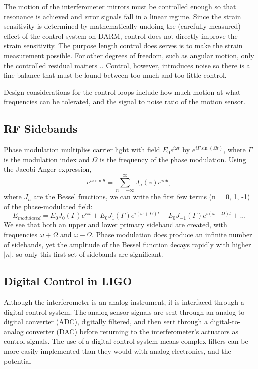 The motion of the interferometer mirrors must be controlled enough so
that resonance is achieved and error signals fall in a linear
regime. Since the strain sensitivity is determined by mathematically
undoing the (carefully measured) effect of the control system on DARM,
control does not directly improve the strain sensitivity. The purpose
length control does serves is to make the strain measurement
possible. For other degrees of freedom, such as angular motion, only
the controlled residual matters ..
Control, however, introduces noise so there is a fine
balance that must be found between too much and too little control.

Design considerations for the control loops include how much motion at
what frequencies can be tolerated, and the signal to noise ratio of
the motion sensor.


\subsection{RF Sidebands}
Phase modulation multiplies carrier light with field
$E_0e^{i\omega t}$ by $e^{i \Gamma \sin{(\Omega t)}}$, where $\Gamma$
is the modulation index and $\Omega$ is the frequency of the phase
modulation. Using the Jacobi-Anger expression,
\begin{equation}
e^{i z \sin{\theta}} = \sum_{n=-\infty}^{\infty} J_n(z) e^{i n \theta},
\end{equation}
where $J_n$ are the Bessel functions, we can write the first few terms
(n = 0, 1, -1) of the phase-modulated field:
\begin{equation}
E_{modulated} = E_0 J_0(\Gamma) e^{i\omega t} + E_0 J_1(\Gamma)
e^{i(\omega + \Omega) t} + E_0 J_{-1}(\Gamma)
e^{i(\omega - \Omega) t} + ...
\end{equation}
We see that both an upper and lower primary sideband are created, with
frequencies $\omega + \Omega$ and $\omega - \Omega$. Phase modulation
does produce an infinite number of sidebands, yet the amplitude of the
Bessel function decays rapidly with higher $|n|$, so only this first
set of sidebands are significant.




\subsection{Digital Control in LIGO}
Although the interferometer is an analog instrument, it is interfaced
through a digital control system. The analog sensor signals are sent
through an analog-to-digital converter (ADC), digitally filtered, and
then sent through a digital-to-analog converter (DAC) before returning
to the interferometer's actuators as control signals. The use of a digital
control system means complex filters can be more easily implemented
than they would with analog electronics, and the potential 

